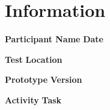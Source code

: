 \section*{Information}

\vspace{1cm}

\textbf{Participant Name} \hfill \textbf{Date}

\vspace{2.5cm}

\textbf{Test} \hfill \textbf{Location}

\vspace{2.5cm}

\textbf{Prototype} \hfill \textbf{Version}

\vspace{2.5cm}

\textbf{Activity} \hfill \textbf{Task}

\vfill